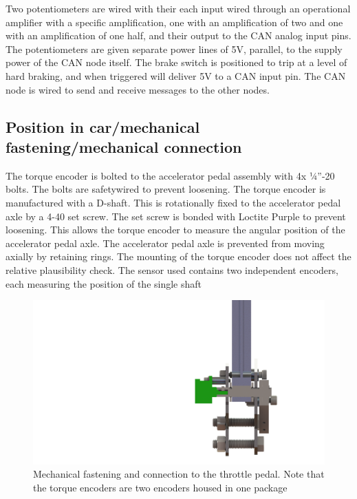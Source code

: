 \documentclass{article}
\begin{document}
Two potentiometers are wired with their each input wired through an operational amplifier with a specific amplification, one with an amplification of two and one with an amplification of one half, and their output to the CAN analog input pins. The potentiometers are given separate power lines of 5V, parallel, to the supply power of the CAN node itself. The brake switch is positioned to trip at a level of hard braking, and when triggered will deliver 5V to a CAN input pin. The CAN node is wired to send and receive messages to the other nodes.

\subsection{Position in car/mechanical fastening/mechanical connection}
The torque encoder is bolted to the accelerator pedal assembly with 4x ¼”-20 bolts. The bolts are safetywired to prevent loosening. The torque encoder is manufactured with a D-shaft. This is rotationally fixed to the accelerator pedal axle by a 4-40 set screw. The set screw is bonded with Loctite Purple to prevent loosening. This allows the torque encoder to measure the angular position of the accelerator pedal axle. The accelerator pedal axle is prevented from moving axially by retaining rings. The mounting of the torque encoder does not affect the relative plausibility check. The sensor used contains two independent encoders, each measuring the position of the single shaft 

\begin{figure}[H]
    \centering
    \includegraphics[width=\linewidth]{encoder_connection.png}
    \caption{Mechanical fastening and connection to the throttle pedal. Note that the torque encoders are two encoders housed in one package}
    \label{fig:encoder_position}
\end{figure}
\end{document}
